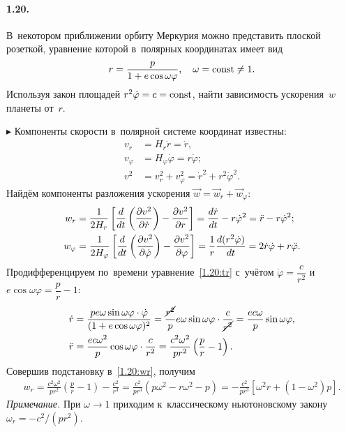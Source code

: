 \documentclass{weekly}
\begin{document}

\paragraph{1.20.} В~некотором приближении орбиту Меркурия
можно представить плоской розеткой, уравнение которой
в~полярных координатах имеет вид
\begin{equation}\label{1.20:tr}
    r = \frac{p}{1+e\cos\omega\varphi}, \quad
    \omega = \mathrm{const} \neq 1.
\end{equation}
Используя закон площадей $r^2 \dot\varphi = c = \mathrm{const}$,
найти зависимость ускорения~$w$ планеты от~$r$.

$\blacktriangleright$ Компоненты скорости
в~полярной системе координат известны:
\begin{align}
    v_r &= H_r \dot r = \dot r, \label{1.20:vr}\\
    v_\varphi &= H_\varphi \dot\varphi = r \dot\varphi;
        \label{1.20:vphi}\\
    v^2 &= v_r^2 + v_\varphi^2 = \dot r^2 + r^2 \dot\varphi^2.
\end{align}
Найдём компоненты разложения ускорения
$\vec w = \vec w_r + \vec w_\varphi$:
\begin{align}
    w_r &= \frac{1}{2H_r}
            \left[ \frac{d }{d t} \left(\frac{\partial v^2}{\partial \dot r}\right) -
            \frac{\partial v^2}{\partial r} \right]
        = \frac{d \dot r}{d t} - r \dot\varphi^2
        = \ddot r - r\dot\varphi^2; \label{1.20:wr}\\
    w_\varphi &= \frac{1}{2H_\varphi}
            \left[ \frac{d }{d t} \left(\frac{\partial v^2}{\partial \dot\varphi}\right) -
            \frac{\partial v^2}{\partial \varphi} \right]
        = \frac{1}{r} \frac{d (r^2 \dot\varphi)}{d t}
        = 2 \dot r \dot\varphi + r \ddot\varphi. \label{1.20:wphi}
\end{align}
Продифференцируем по~времени уравнение~\eqref{1.20:tr} с~учётом
$\dot\varphi = \dfrac{c}{r^2}$ и
$e \cos\omega\varphi = \dfrac{p}{r} - 1$:
\begin{align}
    \dot r &= \frac{pe\omega \sin\omega\varphi \cdot \dot\varphi}
        {(1+e\cos\omega\varphi)^2}
        = \frac{\cancel{r^2}}{p} e\omega \sin\omega\varphi \cdot
            \frac{c}{\cancel{r^2}}
        = \frac{ec\omega}{p} \sin{\omega\varphi}, \\
    \ddot r &= \frac{ec\omega^2}{p} \cos\omega\varphi \cdot
        \frac{c}{r^2} = \frac{c^2 \omega^2}{pr^2}
        \left( \frac{p}{r} - 1 \right).
\end{align}
Совершив подстановку в~\eqref{1.20:wr}, получим
\begin{align}
    w_r = \frac{c^2 \omega^2}{pr^2} \left(\frac{p}{r}-1\right) -
            \frac{c^2}{r^3}
        = \frac{c^2}{pr^3} \left( p \omega^2 - r \omega^2 - p \right)
        = -\frac{c^2}{pr^3} \left[ \omega^2 r +
            \left( 1-\omega^2 \right) p \right].
\end{align}
\textsl{Примечание.} При $\omega \to 1$ приходим к~классическому
ньютоновскому закону $\omega_r = -c^2/(pr^2)$.
\end{document}
